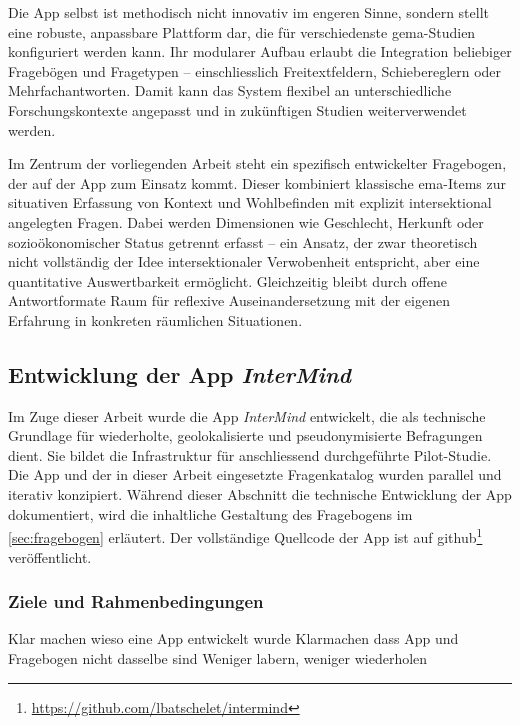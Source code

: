 Die App selbst ist methodisch nicht innovativ im engeren Sinne, sondern stellt eine robuste, anpassbare Plattform dar, die für verschiedenste \acrshort{gema}-Studien konfiguriert werden kann. Ihr modularer Aufbau erlaubt die Integration beliebiger Fragebögen und Fragetypen – einschliesslich Freitextfeldern, Schiebereglern oder Mehrfachantworten. Damit kann das System flexibel an unterschiedliche Forschungskontexte angepasst und in zukünftigen Studien weiterverwendet werden.

Im Zentrum der vorliegenden Arbeit steht ein spezifisch entwickelter Fragebogen, der auf der App zum Einsatz kommt. Dieser kombiniert klassische \gls{ema}-Items zur situativen Erfassung von Kontext und Wohlbefinden mit explizit intersektional angelegten Fragen. Dabei werden Dimensionen wie Geschlecht, Herkunft oder sozioökonomischer Status getrennt erfasst – ein Ansatz, der zwar theoretisch nicht vollständig der Idee intersektionaler Verwobenheit entspricht, aber eine quantitative Auswertbarkeit ermöglicht. Gleichzeitig bleibt durch offene Antwortformate Raum für reflexive Auseinandersetzung mit der eigenen Erfahrung in konkreten räumlichen Situationen.

\subsection{Entwicklung der App \textit{InterMind}}

Im Zuge dieser Arbeit wurde die App \textit{InterMind} entwickelt, die als technische Grundlage für wiederholte, geolokalisierte und pseudonymisierte Befragungen dient. Sie bildet die Infrastruktur für anschliessend durchgeführte Pilot-Studie. Die App und der in dieser Arbeit eingesetzte Fragenkatalog wurden parallel und iterativ konzipiert. Während dieser Abschnitt die technische Entwicklung der App dokumentiert, wird die inhaltliche Gestaltung des Fragebogens im \cref{sec:fragebogen} erläutert. Der vollständige Quellcode der App ist auf \gls{github}\footnote{\href{https://github.com/lbatschelet/intermind}{https://github.com/lbatschelet/intermind}} veröffentlicht.


\subsubsection{Ziele und Rahmenbedingungen}

Klar machen wieso eine App entwickelt wurde
Klarmachen dass App und Fragebogen nicht dasselbe sind
Weniger labern, weniger wiederholen

